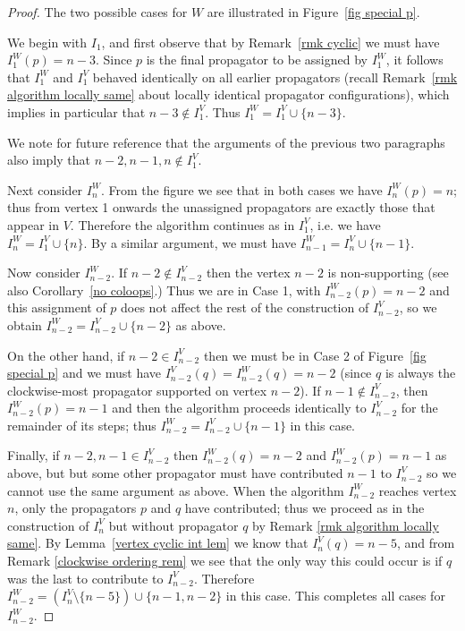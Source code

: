 \documentclass[11pt]{article}
\theoremstyle{remark}
\theoremstyle{definition}
\begin{document}
\begin{proof}
The two possible cases for $W$ are illustrated in Figure~\ref{fig special p}. 

We begin with $I_1$, and first observe that by Remark~\ref{rmk cyclic} we must have $I_1^W(p) = n-3$. Since $p$ is the final propagator to be assigned by $I_1^W$, it follows that $I_1^W$ and $I_1^V$ behaved identically on all earlier propagators (recall Remark~\ref{rmk algorithm locally same} about locally identical propagator configurations), which implies in particular that $n-3 \not\in I_1^V$. Thus $I_1^W = I_1^V\cup\{n-3\}$.

We note for future reference that the arguments of the previous two paragraphs also imply that $n-2,n-1,n \not\in I_1^V$.

Next consider $I_n^{W}$. From the figure we see that in both cases we have $I_n^{W}(p) = n$; thus from vertex 1 onwards the unassigned propagators are exactly those that appear in $V$. Therefore the algorithm continues as in $I_1^{V}$, i.e. we have $I_n^{W} = I_1^{V} \cup \{n\}$. By a similar argument, we must have $I_{n-1}^{W} = I_n^{V} \cup \{n-1\}$.

Now consider $I_{n-2}^{W}$. If $n-2\not\in I_{n-2}^{V}$ then the vertex $n-2$ is non-supporting (see also Corollary~\ref{no coloops}.)  Thus we are in Case 1, with ${I_{n-2}^W(p) = n-2}$ and this assignment of $p$ does not affect the rest of the construction of $I_{n-2}^{V}$, so we obtain ${I_{n-2}^{W} = I_{n-2}^{V}\cup \{n-2\}}$ as above.

On the other hand, if $n-2\in I_{n-2}^{V}$ then we must be in Case 2 of Figure~\ref{fig special p} and we must have ${I_{n-2}^V(q) = I_{n-2}^W(q) = n-2}$ (since $q$ is always the clockwise-most propagator supported on vertex $n-2$). If $n-1 \not\in I_{n-2}^{V}$, then $I_{n-2}^W(p) = n-1$ and then the algorithm proceeds identically to $I_{n-2}^{V}$ for the remainder of its steps; thus $I_{n-2}^{W} = I_{n-2}^{V}\cup \{n-1\}$ in this case.

Finally, if $n-2,n-1 \in I_{n-2}^{V}$ then $I_{n-2}^W(q) = n-2$ and $I_{n-2}^W(p) = n-1$ as above, but but some other propagator must have contributed $n-1$ to $I_{n-2}^{V}$ so we cannot use the same argument as above. When the algorithm $I_{n-2}^W$ reaches vertex $n$, only the propagators $p$ and $q$ have contributed; thus we proceed as in the construction of $I_n^{V}$ but without propagator $q$ by Remark \ref{rmk algorithm locally same}. By Lemma~\ref{vertex cyclic int lem} we know that $I_n^V(q) = n-5$, and from Remark \ref{clockwise ordering rem} we see that the only way this could occur is if $q$ was the last to contribute to $I_{n-2}^V$. %
Therefore $I_{n-2}^{W} = (I_{n}^{V} \setminus \{n-5\}) \cup \{n-1, n-2\}$ in this case. This completes all cases for $I_{n-2}^{W}$.


\end{proof}
\end{document}
